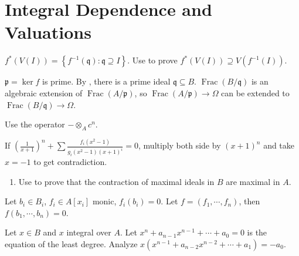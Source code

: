 \section{Integral Dependence and Valuations}

\begin{exercise}\label{ex5.1}
	$f^*(V(I))=\left\{f^{-1}(\mathfrak{q}):\mathfrak{q}\supseteq I\right\}$. Use  to prove $f^*(V(I))\supseteq V\left(f^{-1}(I)\right)$.
\end{exercise}

\begin{exercise}\label{ex5.2}
	$\mathfrak{p}=\ker f$ is prime. By , there is a prime ideal $\mathfrak{q}\subseteq B$. $\operatorname{Frac}(B/\mathfrak{q})$ is an algebraic extension of $\operatorname{Frac}(A/\mathfrak{p})$, so $\operatorname{Frac}(A/\mathfrak{p})\rightarrow\Omega$ can be extended to $\operatorname{Frac}(B/\mathfrak{q})\rightarrow\Omega$.
\end{exercise}

\begin{exercise}\label{ex5.3}
	Use the operator $-\otimes_A c^n$.
\end{exercise}

\begin{exercise}\label{ex5.4}
	If $\left(\frac{1}{x+1}\right)^n+\sum\frac{f_i\left(x^2-1\right)}{g_i\left(x^2-1\right)(x+1)^i}=0$, multiply both side by $(x+1)^n$ and take $x=-1$ to get contradiction.
\end{exercise}

\begin{exercise}\label{ex5.5}
	\begin{enumerate}
		\item[(ii)] Use  to prove that the contraction of maximal ideals in $B$ are maximal in $A$.
	\end{enumerate}
\end{exercise}

\begin{exercise}\label{ex5.6}
	Let $b_i\in B_i$, $f_i\in A\left[x_i\right]$ monic, $f_i(b_i)=0$. Let $f=\left(f_1,\cdots,f_n\right)$, then $f(b_1,\cdots,b_n)=0$.
\end{exercise}

\begin{exercise}\label{ex5.7}
	Let $x\in B$ and $x$ integral over $A$. Let $x^n+a_{n-1}x^{n-1}+\cdots+a_0=0$ is the equation of the least degree. Analyze $x\left(x^{n-1}+a_{n-2}x^{n-2}+\cdots+a_1\right)=-a_0$.
\end{exercise}

